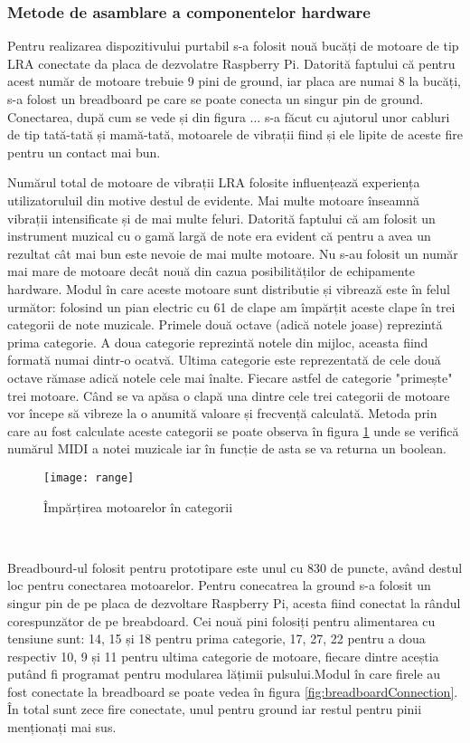 \documentclass[../IoMusT.tex]{subfiles}
\begin{document}
\subsubsection{Metode de asamblare a componentelor hardware}
Pentru realizarea dispozitivului purtabil s-a folosit nouă bucăți de motoare de tip LRA conectate da placa de dezvolatre Raspberry Pi. Datorită faptului că pentru acest număr de motoare trebuie 9 pini de ground, iar placa are numai 8 la bucăți, s-a folost un breadboard  pe care se poate conecta un singur pin de ground. Conectarea, după cum se vede și din figura ... s-a făcut cu ajutorul unor cabluri de tip tată-tată și mamă-tată, motoarele de vibrații fiind și ele lipite  de aceste fire pentru un contact mai bun.
\\
\par Numărul total de motoare de vibrații LRA folosite influențează experiența utilizatoruluil din motive destul de evidente. Mai multe motoare înseamnă vibrații intensificate și de mai multe feluri. Datorită faptului că am folosit un instrument muzical cu o gamă largă de note era evident că pentru a avea un rezultat cât mai bun este nevoie de mai multe motoare. Nu s-au folosit un număr mai mare de motoare decât nouă din cazua posibilităților de echipamente hardware. Modul în care aceste motoare sunt distributie și vibrează este în felul următor: folosind un pian electric cu 61 de clape am împărțit aceste clape în trei categorii de note muzicale. Primele două octave (adică notele joase) reprezintă prima categorie. A doua categorie reprezintă notele din mijloc, aceasta fiind formată numai dintr-o ocatvă. Ultima categorie este reprezentată de cele două octave rămase adică notele cele mai înalte. Fiecare astfel de categorie "primește"  trei motoare. Când se va apăsa o clapă una dintre cele trei categorii de motoare vor începe să vibreze la o anumită valoare și frecvență calculată. Metoda prin care au fost calculate aceste categorii se poate observa în figura \ref{fig:range} unde se verifică numărul MIDI a notei muzicale iar în funcție de asta se va returna un boolean.
\begin{figure}[h]
\centering
\texttt{[image: range]}
\caption{Împărțirea motoarelor în categorii}
\label{fig:range}
\end{figure}  
\\
\par Breadbourd-ul folosit pentru prototipare este unul cu 830 de puncte, având destul loc pentru conectarea motoarelor. Pentru conecatrea la ground s-a folosit un singur pin de pe placa de dezvoltare  Raspberry Pi, acesta fiind conectat la rândul corespunzător de pe breabdoard. Cei nouă pini folosiți pentru alimentarea cu tensiune sunt: 14, 15 și 18 pentru prima categorie, 17, 27, 22 pentru a doua respectiv 10, 9 și 11 pentru ultima categorie de motoare, fiecare dintre aceștia putând fi programat pentru modularea lățimii pulsului.Modul în care firele au fost conectate la breadboard se poate vedea în figura \ref{fig:breadboardConnection}. În total sunt zece fire conectate, unul pentru ground iar restul pentru pinii menționați mai sus.
\end{document}
